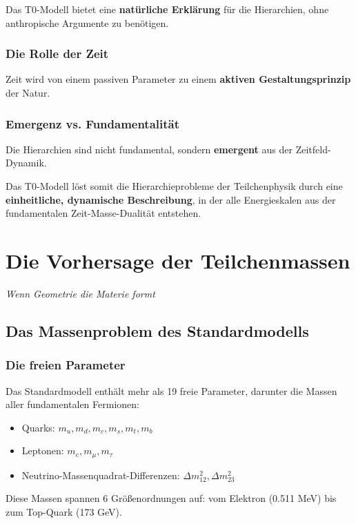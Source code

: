 \documentclass[12pt,a4paper]{report}
\begin{document}
	Das T0-Modell bietet eine \textbf{natürliche Erklärung} für die Hierarchien, ohne anthropische Argumente zu benötigen.
	
	\subsection{Die Rolle der Zeit}
	
	Zeit wird von einem passiven Parameter zu einem \textbf{aktiven Gestaltungsprinzip} der Natur.
	
	\subsection{Emergenz vs. Fundamentalität}
	
	Die Hierarchien sind nicht fundamental, sondern \textbf{emergent} aus der Zeitfeld-Dynamik.
	
	Das T0-Modell löst somit die Hierarchieprobleme der Teilchenphysik durch eine \textbf{einheitliche, dynamische Beschreibung}, in der alle Energieskalen aus der fundamentalen Zeit-Masse-Dualität entstehen.
	\chapter{Die Vorhersage der Teilchenmassen}
	\textit{Wenn Geometrie die Materie formt}
	
	\section{Das Massenproblem des Standardmodells}
	
	\subsection{Die freien Parameter}
	
	Das Standardmodell enthält mehr als 19 freie Parameter, darunter die Massen aller fundamentalen Fermionen:
	
	\begin{itemize}
		\item Quarks: $m_u, m_d, m_c, m_s, m_t, m_b$
		\item Leptonen: $m_e, m_\mu, m_\tau$
		\item Neutrino-Massenquadrat-Differenzen: $\Delta m_{12}^2, \Delta m_{23}^2$
	\end{itemize}
	
	Diese Massen spannen 6 Größenordnungen auf: vom Elektron (0.511 MeV) bis zum Top-Quark (173 GeV).
	
\end{document}
